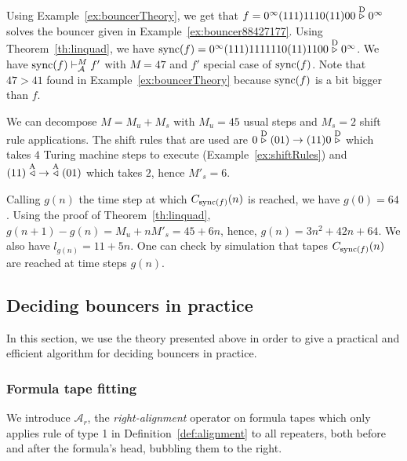 
\begin{example}\label{ex:linquad}
    Using Example~\ref{ex:bouncerTheory}, we get that $f = 0^\infty (111)1110(11)00\stackrel{\text{D}}\triangleright0^\infty$ solves the bouncer given in Example~\ref{ex:bouncer88427177}. Using Theorem~\ref{th:linquad}, we have $\operatorname{sync}(f)= 0^\infty (111)1111110(11)11 00\stackrel{\text{D}}\triangleright0^\infty$.
    We have $\operatorname{sync}(f) \vdash_\mathcal{A}^{M} f'$ with $M = 47$ and $f'$ special case of $\operatorname{sync}(f)$. Note that $47 > 41$ found in Example~\ref{ex:bouncerTheory} because $\operatorname{sync}(f)$ is a bit bigger than $f$.

    We can decompose $M = M_u + M_s$ with $M_u = 45$ usual steps and $M_s = 2$ shift rule applications. The shift rules that are used are $0 \stackrel{\text{D}}\triangleright(01) \to (11)0\stackrel{\text{D}}\triangleright$ which takes $4$ Turing machine steps to execute (Example~\ref{ex:shiftRules}) and $(11) \stackrel{\text{A}}\triangleleft\; \to \;  \stackrel{\text{A}}\triangleleft (01)$ which takes $2$, hence $M'_s = 6$.

    Calling $g(n)$ the time step at which $C_{\operatorname{sync}(f)}(n)$ is reached, we have $g(0)= 64$. Using the proof of Theorem~\ref{th:linquad}, $g(n+1)-g(n) = M_u + n M'_s = 45 + 6n$, hence, $g(n) = 3n^2 + 42n + 64$. We also have $l_{g(n)} = 11 + 5n$. One can check by simulation that tapes $C_{\operatorname{sync}(f)}(n)$ are reached at time steps $g(n)$.


\end{example}
\newpage
\subsection{Deciding bouncers in practice}\label{sec:bouncers-algo}

In this section, we use the theory presented above in order to give a practical and efficient algorithm for deciding bouncers in practice.

\subsubsection{Formula tape fitting}


We introduce $\mathcal{A}_r$, the \textit{right-alignment} operator on formula tapes which only applies rule of type 1 in Definition~\ref{def:alignment} to all repeaters, both before and after the formula's head, bubbling them to the right.

